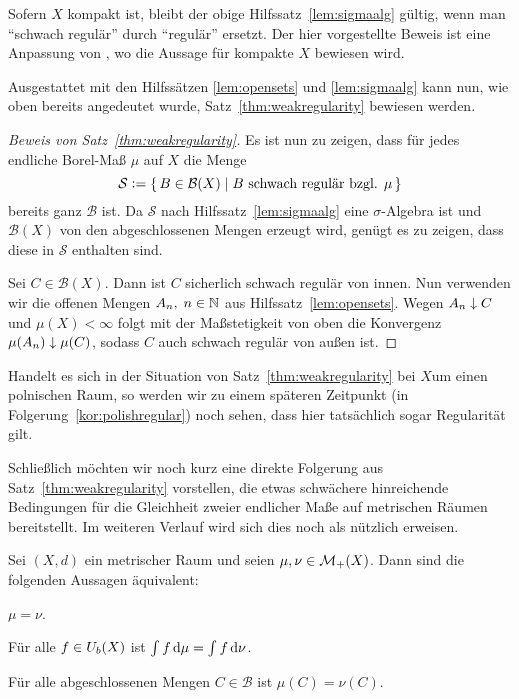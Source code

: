 \documentclass[../main/main.tex]{subfiles}
\begin{document}
	\begin{Bemerkung}
		Sofern $X$ kompakt ist, bleibt der obige Hilfssatz~\ref{lem:sigmaalg} 
		gültig, wenn man \enquote{schwach regulär} durch \enquote{regulär} 
		ersetzt. Der hier vorgestellte Beweis ist eine Anpassung von 
		\cite[Lemma 4.5.5]{Simon.2015}, wo die Aussage für kompakte $X$ bewiesen wird.
	\end{Bemerkung}
	
	Ausgestattet mit den Hilfssätzen \ref{lem:opensets} und \ref{lem:sigmaalg} kann nun, 
	wie oben bereits angedeutet wurde, Satz~\ref{thm:weakregularity} bewiesen werden.
	
	\begin{proof}[Beweis von Satz~\ref{thm:weakregularity}]
		Es ist nun zu zeigen, dass für jedes endliche Borel-Maß $\mu$ auf $X$
		die Menge 
		$$\mathcal{S} \vcentcolon = \left\{\, B \in \mathcal{B}(X) \; \middle| \; B \text{ schwach regulär bzgl. } \mu \,\right\}$$
		bereits ganz $\mathcal{B}$ ist. 
		Da $\mathcal{S}$ nach Hilfssatz~\ref{lem:sigmaalg} eine 
		$\sigma$-Algebra ist und 
		$\mathcal{B}(X)$ von den abgeschlossenen Mengen erzeugt wird, genügt es zu zeigen, 
		dass diese in $\mathcal{S}$ enthalten sind. 
		
		Sei $C \in \mathcal{B}(X)$. Dann ist $C$ sicherlich schwach regulär von innen. 
		Nun verwenden wir die offenen Mengen $A_n, \; n \in \mathbb{N}$ aus 
		Hilfssatz~\ref{lem:opensets}. 
		Wegen $A_n \downarrow C$ und $\mu(X) < \infty$ folgt mit der 
		Maßstetigkeit von oben die Konvergenz $\mu(A_n) \downarrow \mu(C)$,
		sodass $C$ auch schwach regulär von außen ist.
	\end{proof}

	\begin{Bemerkung}
		Handelt es sich in der Situation von Satz~\ref{thm:weakregularity} bei $X$um einen polnischen Raum, 
		so werden wir zu einem späteren Zeitpunkt (in Folgerung~\ref{kor:polishregular}) noch sehen, dass hier tatsächlich sogar Regularität gilt.
	\end{Bemerkung}
	
	Schließlich möchten wir noch kurz eine direkte Folgerung aus Satz~\ref{thm:weakregularity} vorstellen, die etwas 
	schwächere hinreichende Bedingungen für die Gleichheit 
	zweier endlicher Maße auf metrischen Räumen bereitstellt. Im weiteren Verlauf 
	wird sich dies noch als nützlich erweisen.
	
	\begin{Satz}
		\label{thm:measureequality}
		Sei $(X,d)$ ein metrischer Raum und seien $\mu, \nu \in \mathcal{M}_{+}(X)$. 
		Dann sind die folgenden Aussagen äquivalent:
		\begin{equivalentthm}
			\item $\mu = \nu$.
			\item Für alle $f \in U_b(X)$ ist
			$\int_{} \, f \, \mathrm{d}\mu = \int_{} \, f \, \mathrm{d}\nu$.
			\item Für alle abgeschlossenen Mengen $C \in \mathcal{B}$ ist $\mu(C) = \nu(C)$.
		\end{equivalentthm}
	\end{Satz}
	
\end{document}
